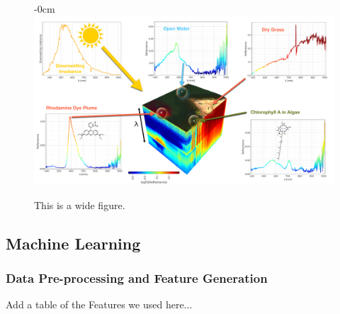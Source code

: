 \documentclass[journal,article,submit,pdftex,moreauthors]{Definitions/mdpi}
\begin{document}
\begin{figure}[H]
\begin{adjustwidth}{-\extralength}{0cm}
\centering
\includegraphics[width=15.5cm]{paper/figures/materials-and-methods/HyperSpectralInfoGraphic.pdf}
\end{adjustwidth}
\caption{This is a wide figure.\label{fig:hsi-infographic}}
\end{figure}  



\subsection{Machine Learning}
\subsubsection{Data Pre-processing and Feature Generation}
Add a table of the Features we used here...
\end{document}
